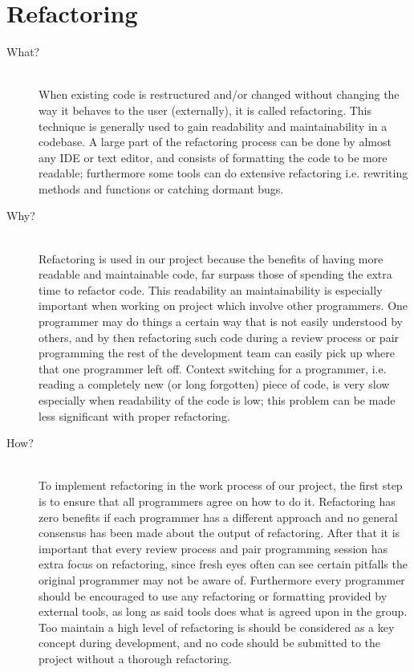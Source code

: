 \section*{Refactoring} %
\label{sec:refactoring}
\begin{description}
    \item[What?]\hfill\\
    When existing code is restructured and/or changed without changing the way it behaves to the user (externally), it is called refactoring.
This technique is generally used to gain readability and maintainability in a codebase.
A large part of the refactoring process can be done by almost any IDE or text editor, and consists of formatting the code to be more readable; furthermore some tools can do extensive refactoring i.e. rewriting methods and functions or catching dormant bugs.

    \item[Why?]\hfill\\ 
    Refactoring is used in our project because the benefits of having more readable and maintainable code, far surpass those of spending the extra time to refactor code.
    This readability an maintainability is especially important when working on project which involve other programmers. 
    One programmer may do things a certain way that is not easily understood by others, and by then refactoring such code during a review process or pair programming the rest of the development team can easily pick up where that one programmer left off.
    Context switching for a programmer, i.e. reading a completely new (or long forgotten) piece of code, is very slow especially when readability of the code is low; this problem can be made less significant with proper refactoring. 
    
    \item[How?]\hfill\\
    To implement refactoring in the work process of our project, the first step is to ensure that all programmers agree on how to do it.
    Refactoring has zero benefits if each programmer has a different approach and no general consensus has been made about the output of refactoring.
    After that it is important that every review process and pair programming session has extra focus on refactoring, since fresh eyes often can see certain pitfalls the original programmer may not be aware of.
    Furthermore every programmer should be encouraged to use any refactoring or formatting provided by external tools, as long as said tools does what is agreed upon in the group. 
    Too maintain a high level of refactoring is should be considered as a key concept during development, and no code should be submitted to the project without a thorough refactoring.  
\end{description}                       

